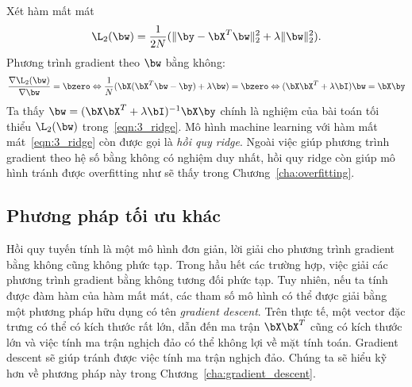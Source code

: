Xét hàm mất mát
\begin{equation}
    \label{eqn:3_ridge}
    \L_2(\bw) = \frac{1}{2N}(\|\by - \bX^T\bw\|_2^2 + \lambda\|\bw\|_2^2).
\end{equation}
Phương trình gradient theo $\bw$ bằng không: 
\begin{equation}
    \frac{\nabla \L_2(\bw)}{\nabla \bw} = \bzero \Leftrightarrow
    \frac{1}{N}(\bX(\bX^T\bw - \by) + \lambda \bw) = \bzero \Leftrightarrow
    (\bX\bX^T + \lambda \bI) \bw = \bX\by 
\end{equation}
Ta thấy $\bw = (\bX\bX^T + \lambda\bI)^{-1}\bX\by$ chính là nghiệm của
bài toán tối thiểu $\L_2(\bw)$ trong~\eqref{eqn:3_ridge}. Mô hình machine learning với hàm mất mát~\eqref{eqn:3_ridge} còn được
gọi là \textit{hồi quy ridge}. 
 Ngoài việc giúp phương trình gradient theo hệ số bằng không có nghiệm duy
nhất, hồi quy ridge còn giúp mô hình tránh được overfitting như sẽ thấy trong Chương~\ref{cha:overfitting}. 

\subsection{Phương pháp tối ưu khác}


Hồi quy tuyến tính là một mô hình đơn giản, lời giải cho phương trình gradient
bằng không cũng không phức tạp. {Trong hầu hết các trường hợp, việc giải các
phương trình gradient bằng không tương đối phức tạp.} Tuy nhiên, nếu ta tính được đàm hàm của hàm mất mát, các tham số mô hình có thể được giải bằng một phương pháp hữu dụng có tên \textit{gradient descent}. Trên thực tế, một vector đặc trưng có thể
có kích thước rất lớn, dẫn đến ma trận $\bX\bX^T$ cũng có kích thước lớn và việc
tính ma trận nghịch đảo có thể không lợi về mặt tính toán. Gradient descent sẽ
giúp tránh được việc tính ma trận nghịch đảo. Chúng ta sẽ hiểu kỹ hơn về phương
pháp này trong Chương~\ref{cha:gradient_descent}.


 